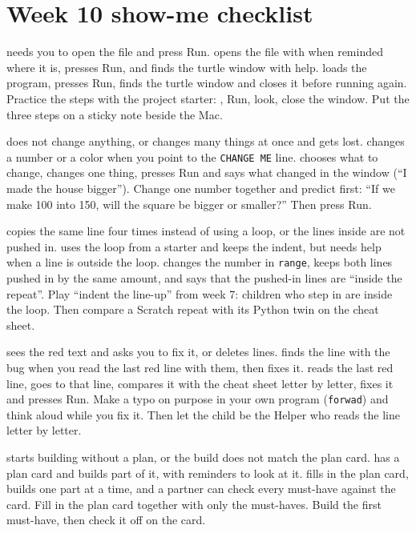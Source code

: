\section{Week 10 show-me checklist}

  {needs you to open the file and press Run.}
  {opens the file with  when reminded where it is, presses Run, and finds the turtle window with help.}
  {loads the program, presses Run, finds the turtle window and closes it before running again.}
  {Practice the steps with the project starter: , Run, look, close the window. Put the three steps on a sticky note beside the Mac.}

  {does not change anything, or changes many things at once and gets lost.}
  {changes a number or a color when you point to the \texttt{CHANGE ME} line.}
  {chooses what to change, changes one thing, presses Run and says what changed in the window (\enquote{I made the house bigger}).}
  {Change one number together and predict first: \enquote{If we make 100 into 150, will the square be bigger or smaller?} Then press Run.}

  {copies the same line four times instead of using a loop, or the lines inside are not pushed in.}
  {uses the loop from a starter and keeps the indent, but needs help when a line is outside the loop.}
  {changes the number in \texttt{range}, keeps both lines pushed in by the same amount, and says that the pushed-in lines are \enquote{inside the repeat}.}
  {Play \enquote{indent the line-up} from week 7: children who step in are inside the loop. Then compare a Scratch repeat with its Python twin on the cheat sheet.}

  {sees the red text and asks you to fix it, or deletes lines.}
  {finds the line with the bug when you read the last red line with them, then fixes it.}
  {reads the last red line, goes to that line, compares it with the cheat sheet letter by letter, fixes it and presses Run.}
  {Make a typo on purpose in your own program (\texttt{forwad}) and think aloud while you fix it. Then let the child be the Helper who reads the line letter by letter.}

  {starts building without a plan, or the build does not match the plan card.}
  {has a plan card and builds part of it, with reminders to look at it.}
  {fills in the plan card, builds one part at a time, and a partner can check every must-have against the card.}
  {Fill in the plan card together with only the must-haves. Build the first must-have, then check it off on the card.}

